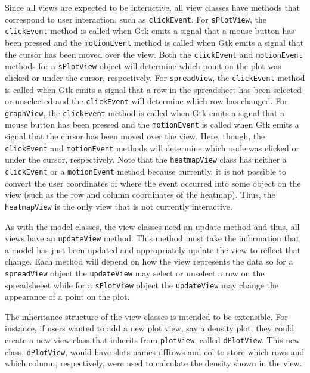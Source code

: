 \documentclass{article}[11pt]
\newcommand{\Rfunction}[1]{{\texttt{#1}}}
\newcommand{\Robject}[1]{{\texttt{#1}}}
\begin{document}
Since all views are expected to be interactive, all
view classes have methods that correspond to user interaction, such as
\Rfunction{clickEvent}.  For \Robject{sPlotView}, the \Rfunction{clickEvent}
method is called when Gtk emits a signal that a mouse button has been pressed
and the \Rfunction{motionEvent} method is called when Gtk emits a signal that
the cursor has been moved over the view.  Both the \Rfunction{clickEvent} and
\Rfunction{motionEvent} methods for a \Robject{sPlotView} object will
determine which point on the plot was clicked or under the cursor,
respectively.  For \Robject{spreadView}, the \Rfunction{clickEvent} method is
called when Gtk emits a signal that a row in the spreadsheet has been selected
or unselected and the \Rfunction{clickEvent} will determine which row has
changed.  For \Robject{graphView}, the \Rfunction{clickEvent} method is called
when Gtk emits a signal that a mouse button has been pressed and the
\Rfunction{motionEvent} is called when Gtk emits a signal that the cursor has
been moved over the view.  Here, though, the \Rfunction{clickEvent} and
\Rfunction{motionEvent} methods will determine which node was clicked or under
the cursor, respectively.  Note that the \Robject{heatmapView} class has
neither a \Rfunction{clickEvent} or a \Rfunction{motionEvent} method because
currently, it is not possible to convert the user coordinates of where the
event occurred into some object on the view (such as the row and column
coordinates of the heatmap).  Thus, the \Robject{heatmapView} is the only view
that is not currently interactive.

As with the model classes, the view classes need an update method and thus, all
views have an \Rfunction{updateView} method.  This method must take the
information that a model has just been updated and appropriately update the
view to reflect that change.  Each method will depend on how the view
represents the data so for a \Robject{spreadView} object the
\Rfunction{updateView} may select or unselect a row on the spreadsheeet while
for a \Robject{sPlotView} object the \Rfunction{updateView} may change the
appearance of a point on the plot.

The inheritance structure of the view classes is intended to be extensible.
For instance, if users wanted to add a new plot view, say a density plot, they
could create a new view class that inherits from \Robject{plotView}, called
\Robject{dPlotView}.  This new class, \Robject{dPlotView}, would have slots
names dfRows and col to store which rows and which column, respectively, were
used to calculate the density shown in the view.
\end{document}
